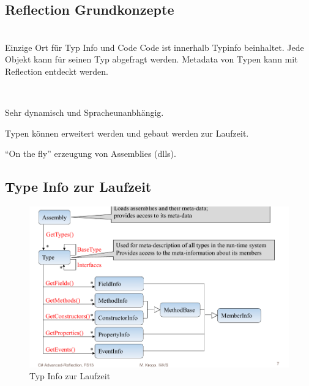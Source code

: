 \documentclass[a4paper,10pt]{scrartcl}
\begin{document}
\subsection{Reflection Grundkonzepte}
\begin{description}
 \item [Metadata] \hfill \\
 \subitem Einzige Ort für Typ Info und Code
 \subitem Code ist innerhalb Typinfo beinhaltet.
 \subitem Jede Objekt kann für seinen Typ abgefragt werden.
 \subitem Metadata von Typen kann mit Reflection entdeckt werden.
 \item [Dynamic Type System] \hfill \\
 \item Sehr dynamisch und Spracheunanbhängig.
 \item Typen können erweitert werden und gebaut werden zur Laufzeit.
 \item ``On the fly'' erzeugung von Assemblies (dlls).
\end{description}

\subsection{Type Info zur Laufzeit}
\begin{figure}[h]
 \centering
 \includegraphics[scale=0.5]{./reflection1.png}
 \caption{Typ Info zur Laufzeit}
\end{figure}
\end{document}
